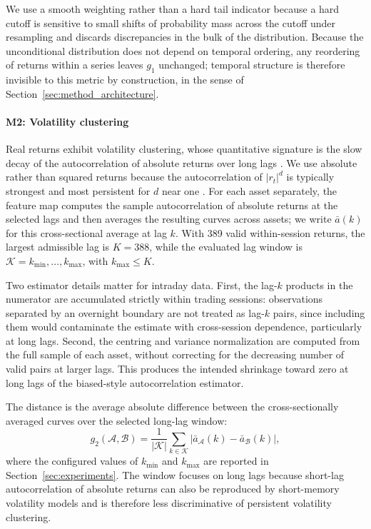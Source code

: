 We use a smooth weighting rather than a hard tail indicator because a
hard cutoff is sensitive to small shifts of probability mass across the
cutoff under resampling and discards discrepancies in the bulk of the
distribution.
Because the unconditional distribution does not depend on temporal
ordering, any reordering of returns within a series leaves $g_1$
unchanged; temporal structure is therefore invisible to this metric by
construction, in the sense of
Section~\ref{sec:method_architecture}.

\paragraph{M2: Volatility clustering}
Real returns exhibit volatility clustering, whose quantitative signature
is the slow decay of the autocorrelation of absolute returns over long
lags \citep{ding1993long, cont2001empirical}.
We use absolute rather than squared returns because the autocorrelation
of $\lvert r_t\rvert^d$ is typically strongest and most persistent for
$d$ near one \citep{ding1993long}.
For each asset separately, the feature map computes the sample
autocorrelation of absolute returns at the selected lags and then
averages the resulting curves across assets; we write $\bar{a}(k)$ for
this cross-sectional average at lag $k$.
With 389 valid within-session returns, the largest admissible lag is
$K=388$, while the evaluated lag window is
$\mathcal{K}={k_{\min},\ldots,k_{\max}}$, with $k_{\max}\leq K$.

Two estimator details matter for intraday data.
First, the lag-$k$ products in the numerator are accumulated strictly
within trading sessions: observations separated by an overnight
boundary are not treated as lag-$k$ pairs, since including them would
contaminate the estimate with cross-session dependence, particularly at
long lags.
Second, the centring and variance normalization are computed from the
full sample of each asset, without correcting for the decreasing number
of valid pairs at larger lags.
This produces the intended shrinkage toward zero at long lags of the
biased-style autocorrelation estimator.

The distance is the average absolute difference between the
cross-sectionally averaged curves over the selected long-lag window:
\begin{equation}
g_2(\mathcal{A},\mathcal{B})
= \frac{1}{|\mathcal{K}|}
\sum_{k\in\mathcal{K}}
\left|
\bar{a}_{\mathcal{A}}(k)
-
\bar{a}_{\mathcal{B}}(k)
\right|,
\label{eq:m2}
\end{equation}
where the configured values of $k_{\min}$ and $k_{\max}$ are reported in
Section~\ref{sec:experiments}.
The window focuses on long lags because short-lag autocorrelation of
absolute returns can also be reproduced by short-memory volatility
models and is therefore less discriminative of persistent volatility
clustering.

